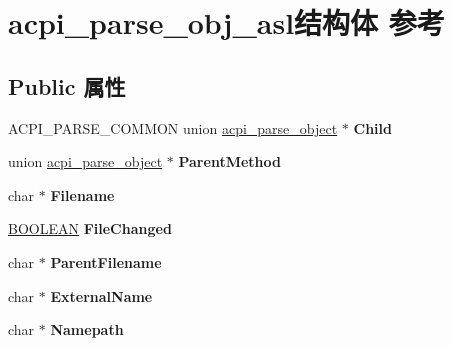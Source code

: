 \hypertarget{structacpi__parse__obj__asl}{}\section{acpi\+\_\+parse\+\_\+obj\+\_\+asl结构体 参考}
\label{structacpi__parse__obj__asl}
\subsection*{Public 属性}
\begin{DoxyCompactItemize}
\item 
\mbox{\label{structacpi__parse__obj__asl_a247ce697455a7f6506767ae274a1a808}} 
A\+C\+P\+I\+\_\+\+P\+A\+R\+S\+E\+\_\+\+C\+O\+M\+M\+ON union \hyperlink{unionacpi__parse__object}{acpi\+\_\+parse\+\_\+object} $\ast$ {\bfseries Child}
\item 
\mbox{\label{structacpi__parse__obj__asl_a2810e8562bf5478af7b73e8a61bb30f1}} 
union \hyperlink{unionacpi__parse__object}{acpi\+\_\+parse\+\_\+object} $\ast$ {\bfseries Parent\+Method}
\item 
\mbox{\label{structacpi__parse__obj__asl_a1fbc984a6471ff2403b1cf127140c1d5}} 
char $\ast$ {\bfseries Filename}
\item 
\mbox{\label{structacpi__parse__obj__asl_a8989954770929adc5e761fbf7425e366}} 
\hyperlink{_processor_bind_8h_a112e3146cb38b6ee95e64d85842e380a}{B\+O\+O\+L\+E\+AN} {\bfseries File\+Changed}
\item 
\mbox{\label{structacpi__parse__obj__asl_ad2801df5f43b9297e89d2d37686c5c01}} 
char $\ast$ {\bfseries Parent\+Filename}
\item 
\mbox{\label{structacpi__parse__obj__asl_a0d5fd2e04754a48346f372253f53f179}} 
char $\ast$ {\bfseries External\+Name}
\item 
\mbox{\label{structacpi__parse__obj__asl_abe30f71b6a007d3ca8ab60105d617a15}} 
char $\ast$ {\bfseries Namepath}
\item 
\mbox{\label{structacpi__parse__obj__asl_afffa1c3606c01b5d5daca6f6c21ae5a1}} 

\end{DoxyCompactItemize}
